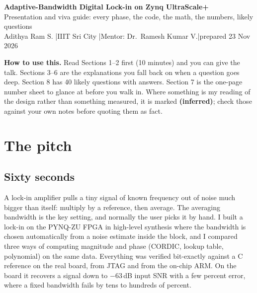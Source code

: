 \documentclass[10pt,a4paper]{article}
\begin{document}
{\LARGE\bfseries\color{navy} Adaptive-Bandwidth Digital Lock-in on Zynq UltraScale+}\\[2pt]
{\large Presentation and viva guide: every phase, the code, the math, the numbers, likely questions}\\[2pt]
{\small Adithya Ram S. \quad|\quad IIIT Sri City \quad|\quad Mentor: Dr.\ Ramesh Kumar V.\quad|\quad prepared 23 Nov 2026}

\vspace{4pt}
\begin{tcolorbox}[colback=white,colframe=navy!40,boxrule=0.4pt,left=5pt,right=5pt,top=3pt,bottom=3pt]
\textbf{How to use this.} Read Sections 1--2 first (10 minutes) and you can give the talk. Sections 3--6 are the explanations you fall back on when a question goes deep. Section 8 has 40 likely questions with answers. Section 7 is the one-page number sheet to glance at before you walk in. Where something is my reading of the design rather than something measured, it is marked \textbf{(inferred)}; check those against your own notes before quoting them as fact.
\end{tcolorbox}

\section{The pitch}
\subsection{Sixty seconds}
\begin{say}
A lock-in amplifier pulls a tiny signal of known frequency out of noise much bigger than itself: multiply by a reference, then average. The averaging bandwidth is the key setting, and normally the user picks it by hand. I built a lock-in on the PYNQ-ZU FPGA in high-level synthesis where the bandwidth is chosen automatically from a noise estimate inside the block, and I compared three ways of computing magnitude and phase (CORDIC, lookup table, polynomial) on the same data. Everything was verified bit-exactly against a C reference on the real board, from JTAG and from the on-chip ARM. On the board it recovers a signal down to $-63$\,dB input SNR with a few percent error, where a fixed bandwidth fails by tens to hundreds of percent.
\end{say}
\end{document}
